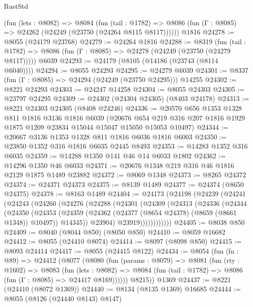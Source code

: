 \begin{lexlean}{RustStd}
\begin{coremodule}
    (fun (lets : @8082) =>
    @8084
      (fun (tail : @1782) =>
      @8086 (fun (Γ : @8085) => @24262 (@24249 (@23750 (@24264 @8115 @8117))))))
    @1816
@24278 := @8055 (@24179 @23768)
@24279 := @24264 @1816
@24288 := @8319
    (fun (tail : @1782) => @8086 (fun (Γ : @8085) => @24278 (@24249 (@23750 (@24279 @8117)))))
    @6039
@24293 := @24179 (@8105 (@14186 (@23743 (@8114 @6040))))
@24294 := @8055 @24293
@24295 := @24279 @6039
@24301 := @8337 (fun (Γ : @8085) => @24294 (@24249 (@23750 @24295))) @14255
@24302 := @8221 @24293
@24303 := @24247 @14258
@24304 := @8055 @24303
@24305 := @23797 @24295
@24309 := @24302 (@24304 @24305) (@8403 @24178)
@24313 := @8221 @24303 @24305 (@8408 @24246)
@24336 := @20570
    @656
    @1353
    @1328
    @811
    @1816
    @3136
    @1816
    @6039
    (@20676 @654 @219 @316 @207 @1816 @1929 @1875 @1209 @23834 @15044 @15047 @15050 @15053 @10497)
@24344 := @20667 @3136 @1353 @1328 @811 @1816 @6036 @1816 @6003
@24350 := @23850 @1352 @316 @1816 @6035 @2445 @8493
@24353 := @14283 @1352 @316 @6035
@24359 := @14288 @1350 @141 @46 @14 @6033 @1802
@24362 := @14296 @1350 @46 @6033
@24371 := @20676 @1348 @219 @316 @46 @1816 @2129 @1875 @1489 @23882
@24372 := @8069 @1348
@24373 := @8265 @24372
@24374 := @24371 @24373
@24375 := @8139 @1489
@24377 := @24374 (@8650 @24375)
@24378 := @8163 @1489
@24404 := @24173
    (@24198
      (@24239
        (@24241
          (@24243
            (@24260
              (@24276
                (@24288
                  (@24301
                    (@24309
                      (@24313
                        (@24336
                          (@24344
                            (@24350
                              (@24353
                                (@24359
                                  (@24362 (@24377 (@8654 @24378) (@8659 (@8661 @1348)) @10497))
                                  @14345))
                              @23904)
                            @23919))))))))))))
@24405 := @8038 @850
@24409 := @8040 (@8044 @850) (@8050 @850)
@24410 := @8059 @16682
@24412 := @8055 (@24410 @8074)
@24414 := @8097 (@8098 @850)
@24415 := @8093 @24414
@24417 := @8055 (@24415 @8122)
@24434 := @8054
    (fun (fn : @89) =>
    @24412
      (@8077
        (@8080
          (fun (params : @8079) =>
          @8081
            (fun (rty : @1602) =>
            @8083
              (fun (lets : @8082) =>
              @8084 (fun (tail : @1782) => @8086 (fun (Γ : @8085) => @24417 @8169))))))
        @8215))
    @1369
@24437 := @8221 (@24410 (@8072 @1369))
@24440 := @8134 (@8135 @1369) @16685
@24444 := @8055 (@8126 (@24440 @8143) @8147)

\end{coremodule}
\end{lexlean}
